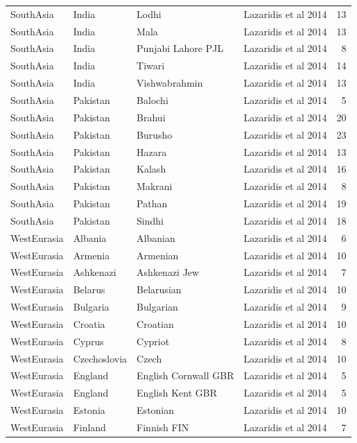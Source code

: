 \begin{longtable}[t]{lll>{\raggedright\arraybackslash}p{9em}r}
\addlinespace
SouthAsia & India & Lodhi & Lazaridis et al 2014 & 13\\
SouthAsia & India & Mala & Lazaridis et al 2014 & 13\\
SouthAsia & India & Punjabi Lahore PJL & Lazaridis et al 2014 & 8\\
SouthAsia & India & Tiwari & Lazaridis et al 2014 & 14\\
SouthAsia & India & Vishwabrahmin & Lazaridis et al 2014 & 13\\
\addlinespace
SouthAsia & Pakistan & Balochi & Lazaridis et al 2014 & 5\\
SouthAsia & Pakistan & Brahui & Lazaridis et al 2014 & 20\\
SouthAsia & Pakistan & Burusho & Lazaridis et al 2014 & 23\\
SouthAsia & Pakistan & Hazara & Lazaridis et al 2014 & 13\\
SouthAsia & Pakistan & Kalash & Lazaridis et al 2014 & 16\\
\addlinespace
SouthAsia & Pakistan & Makrani & Lazaridis et al 2014 & 8\\
SouthAsia & Pakistan & Pathan & Lazaridis et al 2014 & 19\\
SouthAsia & Pakistan & Sindhi & Lazaridis et al 2014 & 18\\
WestEurasia & Albania & Albanian & Lazaridis et al 2014 & 6\\
WestEurasia & Armenia & Armenian & Lazaridis et al 2014 & 10\\
\addlinespace
WestEurasia & Ashkenazi & Ashkenazi Jew & Lazaridis et al 2014 & 7\\
WestEurasia & Belarus & Belarusian & Lazaridis et al 2014 & 10\\
WestEurasia & Bulgaria & Bulgarian & Lazaridis et al 2014 & 9\\
WestEurasia & Croatia & Croatian & Lazaridis et al 2014 & 10\\
WestEurasia & Cyprus & Cypriot & Lazaridis et al 2014 & 8\\
\addlinespace
WestEurasia & Czechoslovia & Czech & Lazaridis et al 2014 & 10\\
WestEurasia & England & English Cornwall GBR & Lazaridis et al 2014 & 5\\
WestEurasia & England & English Kent GBR & Lazaridis et al 2014 & 5\\
WestEurasia & Estonia & Estonian & Lazaridis et al 2014 & 10\\
WestEurasia & Finland & Finnish FIN & Lazaridis et al 2014 & 7\\

\end{longtable}

